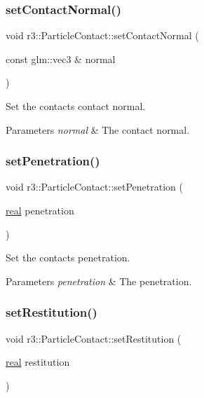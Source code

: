\subsubsection{\texorpdfstring{set\+Contact\+Normal()}{setContactNormal()}}
{\footnotesize\ttfamily void r3\+::\+Particle\+Contact\+::set\+Contact\+Normal (\begin{DoxyParamCaption}\item[{const glm\+::vec3 \&}]{normal }\end{DoxyParamCaption})}



Set the contact\textquotesingle{}s contact normal. 


\begin{DoxyParams}{Parameters}
{\em normal} & The contact normal. \\
\hline
\end{DoxyParams}
\mbox{\label{classr3_1_1_particle_contact_ade0d7d9fddc11108eacd522cb03b2ffd}} 
\subsubsection{\texorpdfstring{set\+Penetration()}{setPenetration()}}
{\footnotesize\ttfamily void r3\+::\+Particle\+Contact\+::set\+Penetration (\begin{DoxyParamCaption}\item[{\mbox{\hyperlink{namespacer3_ab2016b3e3f743fb735afce242f0dc1eb}{real}}}]{penetration }\end{DoxyParamCaption})}



Set the contact\textquotesingle{}s penetration. 


\begin{DoxyParams}{Parameters}
{\em penetration} & The penetration. \\
\hline
\end{DoxyParams}
\mbox{\label{classr3_1_1_particle_contact_ad4e76907d589db86ef3e3ff767c3bb6e}} 
\subsubsection{\texorpdfstring{set\+Restitution()}{setRestitution()}}
{\footnotesize\ttfamily void r3\+::\+Particle\+Contact\+::set\+Restitution (\begin{DoxyParamCaption}\item[{\mbox{\hyperlink{namespacer3_ab2016b3e3f743fb735afce242f0dc1eb}{real}}}]{restitution }\end{DoxyParamCaption})}



